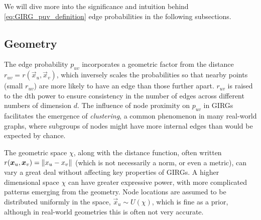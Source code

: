 We will dive more into the significance and intuition behind \cref{eq:GIRG_puv_definition} edge probabilities in the following subsections.






\subsection{Geometry}
The edge probability $p_{uv}$ incorporates a geometric factor from the distance $r_{uv} = r(\vec{x}_u, \vec{x}_v)$, which inversely scales the probabilities so that nearby points (small $r_{uv}$) are more likely to have an edge than those further apart.
$r_{uv}$ is raised to the dth power to ensure consistency in the number of edges across different numbers of dimension $d$.
The influence of node proximity on $p_{uv}$ in GIRGs facilitates the emergence of \textit{clustering}, a common phenomenon in many real-world graphs, where subgroups of nodes might have more internal edges than would be expected by chance.

The geometric space $\chi$, along with the distance function, often written $r(\bm{x}_u, \bm{x}_v) = \left\lVert x_u - x_v\right\rVert$ (which is not necessarily a norm, or even a metric), can vary a great deal without affecting key properties of GIRGs. A higher dimensional space $\chi$ can have greater expressive power, with more complicated patterns emerging from the geometry. Node locations are assumed to be distributed uniformly in the space, $\vec{x}_u \sim U(\chi)$, which is fine as a prior, although in real-world geometries this is often not very accurate.




